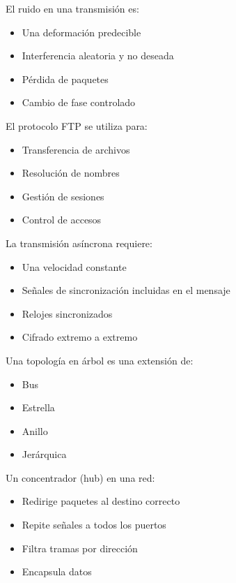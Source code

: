 \documentclass[11pt]{article}
\begin{document}
El ruido en una transmisión es:

\begin{itemize}
\item Una deformación predecible

\item Interferencia aleatoria y no deseada

\item Pérdida de paquetes

\item Cambio de fase controlado
\end{itemize}

El protocolo FTP se utiliza para:

\begin{itemize}
\item Transferencia de archivos

\item Resolución de nombres

\item Gestión de sesiones

\item Control de accesos
\end{itemize}

La transmisión asíncrona requiere:

\begin{itemize}
\item Una velocidad constante

\item Señales de sincronización incluidas en el mensaje

\item Relojes sincronizados

\item Cifrado extremo a extremo
\end{itemize}

Una topología en árbol es una extensión de:

\begin{itemize}
\item Bus

\item Estrella

\item Anillo

\item Jerárquica
\end{itemize}

Un concentrador (hub) en una red:

\begin{itemize}
\item Redirige paquetes al destino correcto

\item Repite señales a todos los puertos

\item Filtra tramas por dirección

\item Encapsula datos
\end{itemize}
\end{document}
